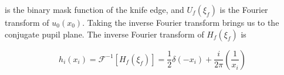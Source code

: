 is the binary mask function of the knife edge, and $U_f(\xi_f)$ is the Fourier transform of $u_0(x_0)$. Taking the inverse Fourier transform brings us to the conjugate pupil plane. The inverse Fourier transform of $H_f(\xi_f)$ is


\begin{equation}
    h_i(x_i)= \mathcal{F}^{-1}[H_f(\xi_f)] =
    \frac{1}{2} \delta(-x_i) + \frac{i}{2\pi} \left(\frac{1}{x_i}\right)
\label{delta}
\end{equation}





    




